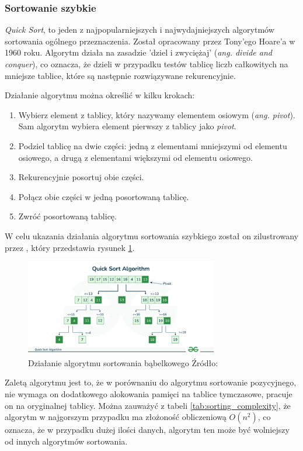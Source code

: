 \subsubsection{Sortowanie szybkie}
\textit{Quick Sort}, to jeden z najpopularniejszych i najwydajniejszych algorytmów sortowania ogólnego przeznaczenia. Został opracowany przez Tony'ego Hoare'a w 1960 roku. Algorytm działa na zasadzie 'dziel i zwyciężaj' (\textit{ang. divide and conquer}), co oznacza, że dzieli w przypadku testów tablicę liczb całkowitych na mniejsze tablice, które są następnie rozwiązywane rekurencyjnie.

Działanie algorytmu można określić w kilku krokach:
\begin{enumerate}
  \item Wybierz element z tablicy, który nazywamy elementem osiowym (\textit{ang. pivot}). Sam algorytm wybiera element pierwszy z tablicy jako \textit{pivot}.
  \item Podziel tablicę na dwie części: jedną z elementami mniejszymi od elementu osiowego, a drugą z elementami większymi od elementu osiowego.
  \item Rekurencyjnie posortuj obie części.
  \item Połącz obie części w jedną posortowaną tablicę.
  \item Zwróć posortowaną tablicę.
\end{enumerate}

W celu ukazania działania algorytmu sortowania szybkiego został on zilustrowany przez \cite{quick_sort}, który przedstawia rysunek \ref{fig:quick_sort}.

\begin{figure}[H]
  \centering
  \includegraphics[width=0.75\textwidth]{Figures/quick_sort.png}
  \caption{Działanie algorytmu sortowania bąbelkowego Źródło: \cite{quick_sort}}
  \label{fig:quick_sort}
\end{figure}

Zaletą algorytmu jest to, że w porównaniu do algorytmu sortowanie pozycyjnego, nie wymaga on dodatkowego alokowania pamięci na tablice tymczasowe, pracuje on na oryginalnej tablicy. Można zauważyć z tabeli \ref{tab:sorting_complexity}, że algorytm w najgorszym przypadku ma złożoność obliczeniową $O(n^2)$, co oznacza, że w przypadku dużej ilości danych, algorytm ten może być wolniejszy od innych algorytmów sortowania.

